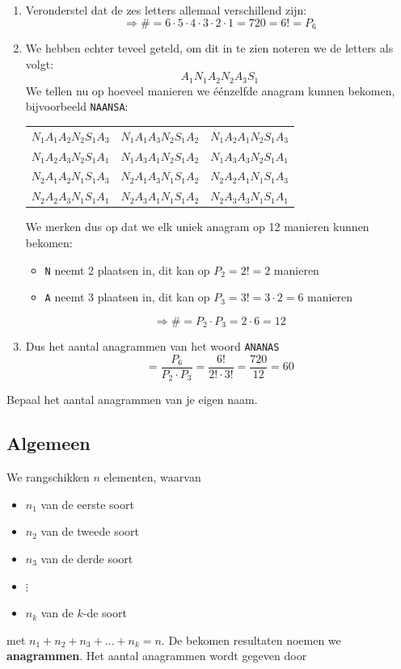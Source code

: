 \documentclass[12pt,a4paper,twoside]{article}
\begin{document}
\begin{enumerate}
  \item Veronderstel dat de zes letters allemaal verschillend zijn:\\
  $$\Rightarrow \#=6\cdot5\cdot4\cdot3\cdot2\cdot1=720=6!=P_6$$
  \item We hebben echter teveel geteld, om dit in te zien noteren we de letters als volgt:
  $$A_1N_1A_2N_2A_3S_1$$
  We tellen nu op hoeveel manieren we éénzelfde anagram kunnen bekomen, bijvoorbeeld \verb#NAANSA#:
  \begin{center}
  \begin{tabular}{ccc}
    $N_1A_1A_2N_2S_1A_3$ & $N_1A_1A_3N_2S_1A_2$ & $N_1A_2A_1N_2S_1A_3$\\
    $N_1A_2A_3N_2S_1A_1$ & $N_1A_3A_1N_2S_1A_2$ & $N_1A_3A_3N_2S_1A_1$\\
    $N_2A_1A_2N_1S_1A_3$ & $N_2A_1A_3N_1S_1A_2$ & $N_2A_2A_1N_1S_1A_3$\\
    $N_2A_2A_3N_1S_1A_1$ & $N_2A_3A_1N_1S_1A_2$ & $N_2A_3A_3N_1S_1A_1$\\
  \end{tabular}
  \end{center}
  We merken dus op dat we elk uniek anagram op 12 manieren kunnen bekomen:
  \begin{itemize}
    \item \verb#N# neemt 2 plaatsen in, dit kan op $P_2=2!=2$ manieren
    \item \verb#A# neemt 3 plaatsen in, dit kan op $P_3=3!=3\cdot2=6$ manieren
  \end{itemize}
  $$\Rightarrow \#=P_2\cdot P_3=2\cdot6=12$$
  \item Dus het aantal anagrammen van het woord \verb#ANANAS#
  $$=\dfrac{P_6}{P_2\cdot P_3}=\dfrac{6!}{2!\cdot 3!}=\dfrac{720}{12}=60$$
\end{enumerate}



\begin{oefening}
Bepaal het aantal anagrammen van je eigen naam.
\end{oefening}



\subsection{Algemeen}

We rangschikken $n$ elementen, waarvan
\begin{itemize}
  \item $n_1$ van de eerste soort
  \item $n_2$ van de tweede soort
  \item $n_3$ van de derde soort
  \item $\vdots$
  \item $n_k$ van de $k$-de soort
\end{itemize}
met $n_1+n_2+n_3+\dots+n_k=n$. De bekomen resultaten noemen we {\bf anagrammen}. Het aantal anagrammen wordt gegeven door
\end{document}
